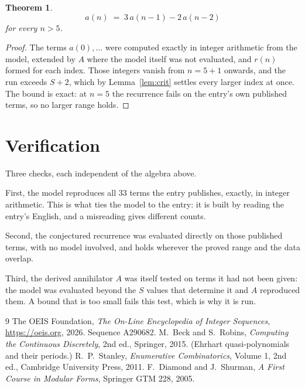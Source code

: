 \documentclass[11pt,a4paper]{article}
\theoremstyle{plain}
\newtheorem{theorem}{Theorem}
\theoremstyle{definition}
\begin{document}
\begin{theorem}
\[
a(n)\;=\;3\,a(n-1) - 2\,a(n-2)
\]
for every $n>5$.
\end{theorem}

\begin{proof}
The terms $a(0),\dots$ were computed exactly in integer arithmetic from the model, extended by
$A$ where the model itself was not evaluated, and $r(n)$ formed for each index. Those integers
vanish from $n=5+1$ onwards, and the run exceeds $S+2$, which by
Lemma~\ref{lem:crit} settles every larger index at once. The bound is exact: at $n=5$ the recurrence fails on the entry's own published terms, so no larger range holds.
\end{proof}

\section{Verification}

Three checks, each independent of the algebra above.

First, the model reproduces all $33$ terms the entry publishes, exactly, in integer
arithmetic. This is what ties the model to the entry: it is built by reading the entry's
English, and a misreading gives different counts.

Second, the conjectured recurrence was evaluated directly on those published terms, with no
model involved, and holds wherever the proved range and the data overlap.

Third, the derived annihilator $A$ was itself tested on terms it had not been given: the model
was evaluated beyond the $S$ values that determine it and $A$ reproduced them. A bound that is
too small fails this test, which is why it is run.

\begin{thebibliography}{9}
 The OEIS Foundation, \emph{The On-Line Encyclopedia of Integer
Sequences}, \url{https://oeis.org}, 2026. Sequence A290682.
 M.~Beck and S.~Robins, \emph{Computing the Continuous Discretely},
2nd ed., Springer, 2015. (Ehrhart quasi-polynomials and their periods.)
 R.~P.~Stanley, \emph{Enumerative Combinatorics}, Volume 1, 2nd ed.,
Cambridge University Press, 2011.
 F.~Diamond and J.~Shurman, \emph{A First Course in Modular Forms},
Springer GTM 228, 2005.
\end{thebibliography}
\end{document}
